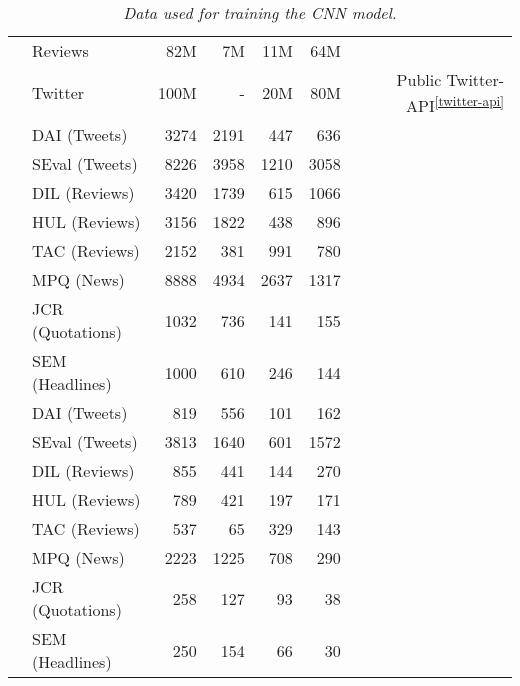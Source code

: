 \begin{table}[h]
\begin{adjustbox}{max width=\columnwidth}
\begin{tabular}{clrrrrr}
			& Reviews & 82M & 7M & 11M & 64M & \cite{Zhang:2015}\\
			& Twitter & 100M & - & 20M & 80M & Public Twitter-API\textsuperscript{\ref{twitter-api}} \\
			\hline
			& DAI (Tweets)    & 3274  & 2191 & 447 & 636 & \cite{Narr:2012}\\
			& SEval (Tweets)  & 8226  & 3958 & 1210 & 3058 & \cite{SemEval:2016:task4} \\
			& DIL (Reviews)   & 3420  & 1739 & 615 & 1066 & \cite{Ding:2008} \\
			& HUL (Reviews)   & 3156  & 1822 & 438 & 896 & \cite{Hu:2004} \\
			& TAC (Reviews)   & 2152  & 381 & 991 & 780 & \cite{Tackstrom:2011}\\
			& MPQ (News)    & 8888  & 4934 & 2637 & 1317 & \cite{Wiebe:2005} \\
			& JCR (Quotations)  & 1032  & 736 & 141 & 155 & \cite{Balahur:2013} \\
			& SEM (Headlines)   & 1000  & 610 & 246 & 144 & \cite{strapparava2007semeval}  \\
			\hline
			& DAI (Tweets)    & 819   & 556 & 101 & 162 & \cite{Narr:2012}\\
			& SEval (Tweets)  & 3813  & 1640 & 601 & 1572 & \cite{SemEval:2016:task4} \\
			& DIL (Reviews)   & 855   & 441 & 144 & 270 & \cite{Ding:2008} \\
			& HUL (Reviews)   & 789 & 421 & 197 & 171 & \cite{Hu:2004} \\
			& TAC (Reviews)   & 537   & 65 & 329 & 143 & \cite{Tackstrom:2011} \\
			& MPQ (News)    & 2223  & 1225 & 708 & 290 & \cite{Wiebe:2005} \\
			& JCR (Quotations)  & 258 & 127 & 93 & 38 & \cite{Balahur:2013} \\
			& SEM (Headlines)   & 250 & 154 & 66 & 30 & \cite{strapparava2007semeval} \\
			\hline
			\hline
		\end{tabular}
	\end{adjustbox}
	\caption{\textit{Data used for training the CNN model.}}
	\label{tbl:data}
\end{table}

